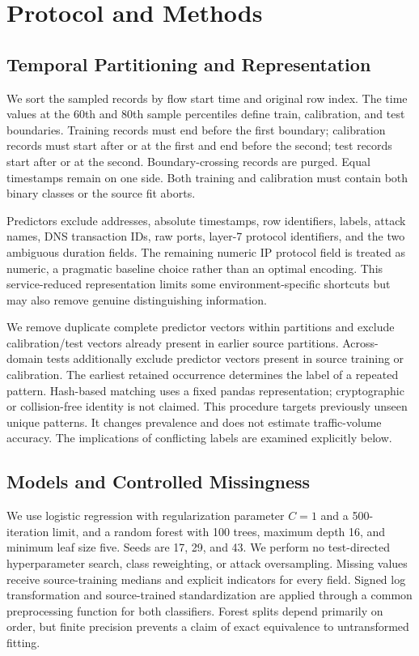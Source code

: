 \documentclass[manuscript,screen,nonacm]{acmart}
\begin{document}
\section{Protocol and Methods}
\subsection{Temporal Partitioning and Representation}
We sort the sampled records by flow start time and original row index. The time values at the 60th and 80th sample percentiles define train, calibration, and test boundaries. Training records must end before the first boundary; calibration records must start after or at the first and end before the second; test records start after or at the second. Boundary-crossing records are purged. Equal timestamps remain on one side. Both training and calibration must contain both binary classes or the source fit aborts.

Predictors exclude addresses, absolute timestamps, row identifiers, labels, attack names, DNS transaction IDs, raw ports, layer-7 protocol identifiers, and the two ambiguous duration fields. The remaining numeric IP protocol field is treated as numeric, a pragmatic baseline choice rather than an optimal encoding. This service-reduced representation limits some environment-specific shortcuts but may also remove genuine distinguishing information.

We remove duplicate complete predictor vectors within partitions and exclude calibration/test vectors already present in earlier source partitions. Across-domain tests additionally exclude predictor vectors present in source training or calibration. The earliest retained occurrence determines the label of a repeated pattern. Hash-based matching uses a fixed pandas representation; cryptographic or collision-free identity is not claimed. This procedure targets previously unseen unique patterns. It changes prevalence and does not estimate traffic-volume accuracy. The implications of conflicting labels are examined explicitly below.


\subsection{Models and Controlled Missingness}
We use logistic regression with regularization parameter $C=1$ and a 500-iteration limit, and a random forest with 100 trees, maximum depth 16, and minimum leaf size five. Seeds are 17, 29, and 43. We perform no test-directed hyperparameter search, class reweighting, or attack oversampling. Missing values receive source-training medians and explicit indicators for every field. Signed log transformation and source-trained standardization are applied through a common preprocessing function for both classifiers. Forest splits depend primarily on order, but finite precision prevents a claim of exact equivalence to untransformed fitting.
\end{document}
